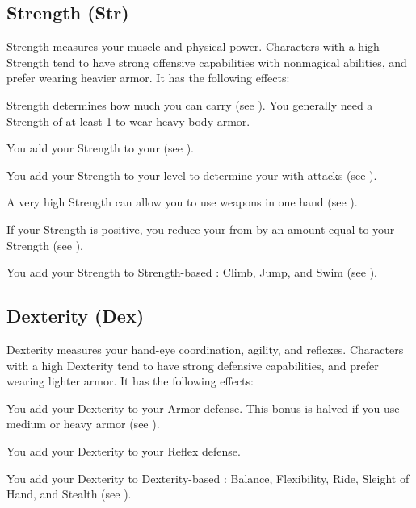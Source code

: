   \subsection{Strength (Str)}\label{Strength}
    {
      Strength measures your muscle and physical power.
      Characters with a high Strength tend to have strong offensive capabilities with nonmagical abilities, and prefer wearing heavier armor.
      It has the following effects:
      \begin{raggeditemize}
        \item Strength determines how much you can carry (see ).
          You generally need a Strength of at least 1 to wear heavy body armor.
        \item You add your Strength to your  (see ).
        \item You add your Strength to your level to determine your  with  attacks (see ).
        \item A very high Strength can allow you to use  weapons in one hand (see ).
        \item If your Strength is positive, you reduce your  from  by an amount equal to your Strength (see ).
        \item You add your Strength to Strength-based : Climb, Jump, and Swim (see ).
      \end{raggeditemize}
    }

  \subsection{Dexterity (Dex)}\label{Dexterity}
    {
      Dexterity measures your hand-eye coordination, agility, and reflexes.
      Characters with a high Dexterity tend to have strong defensive capabilities, and prefer wearing lighter armor.
      It has the following effects:
      \begin{raggeditemize}
        \item You add your Dexterity to your Armor defense.
          This bonus is halved if you use medium or heavy armor (see ).
        \item You add your Dexterity to your Reflex defense.
        \item You add your Dexterity to Dexterity-based : Balance, Flexibility, Ride, Sleight of Hand, and Stealth (see ).
      \end{raggeditemize}
    }

